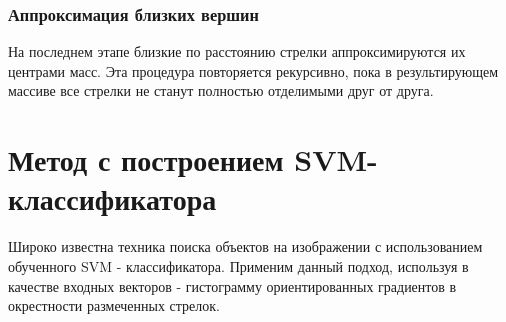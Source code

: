 \subsubsection{Аппроксимация близких вершин}
\label{approxi}
На последнем этапе близкие по расстоянию стрелки аппроксимируются их центрами масс.
Эта процедура повторяется рекурсивно, пока в результирующем массиве все стрелки не станут полностью отделимыми друг от друга.

\section{Метод с построением SVM-классификатора}
\label{SVMClassifier}
Широко известна техника поиска объектов на изображении с использованием обученного SVM\cite{b:SVM} - классификатора. Применим данный подход, используя в качестве входных векторов - гистограмму ориентированных градиентов\cite{b:HOG} в окрестности размеченных стрелок. 
